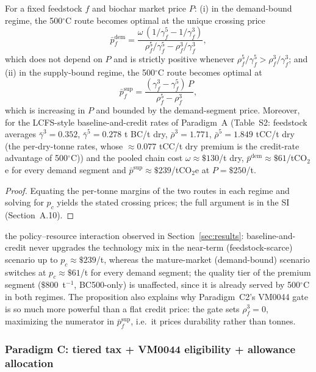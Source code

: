 \begin{proposition}
\label{prop:regime}
For a fixed feedstock $f$ and biochar market price $P$:
(i) in the demand-bound regime, the 500$^\circ$C route becomes optimal at
the unique crossing price
\begin{equation}
\bar{p}^{\mathrm{dem}}_f = \frac{\omega\,(1/\gamma^5_f-1/\gamma^3_f)}
{\rho^5_f/\gamma^5_f-\rho^3_f/\gamma^3_f},
\end{equation}
which does not depend on $P$ and is strictly positive whenever
$\rho^5_f/\gamma^5_f>\rho^3_f/\gamma^3_f$; and
(ii) in the supply-bound regime, the 500$^\circ$C route becomes optimal at
\begin{equation}
\bar{p}^{\mathrm{sup}}_f = \frac{(\gamma^3_f-\gamma^5_f)\,P}
{\rho^5_f-\rho^3_f},
\end{equation}
which is increasing in $P$ and bounded by the demand-segment price.
Moreover, for the LCFS-style baseline-and-credit rates of Paradigm~A
(Table~S2: feedstock averages $\bar{\gamma}^{3}=0.352$,
$\bar{\gamma}^{5}=0.278$ t BC/t dry, $\bar{\rho}^{3}=1.771$,
$\bar{\rho}^{5}=1.849$ tCC/t dry (the per-dry-tonne rates, whose
$\approx 0.077$ tCC/t dry premium is the credit-rate advantage of
500$^\circ$C)) and the pooled chain cost $\omega\approx\$130$/t dry,
$\bar{p}^{\mathrm{dem}}\approx\$61$/tCO$_2$e for every demand segment and
$\bar{p}^{\mathrm{sup}}\approx\$239$/tCO$_2$e at $P=\$250$/t.
\end{proposition}
\begin{proof}
Equating the per-tonne margins of the two routes in each regime and solving
for $p_c$ yields the stated crossing prices; the full argument is in the SI
(Section~A.10).
\end{proof} the policy--resource interaction observed in
Section~\ref{sec:results}: baseline-and-credit never
upgrades the technology mix in the near-term (feedstock-scarce) scenario up to
$p_c\approx\$239$/t, whereas the mature-market (demand-bound) scenario
switches at $p_c\approx\$61$/t for every demand segment; the quality
tier of the premium segment ($\$800$~t$^{-1}$, BC500-only) is unaffected,
since it is already served by 500$^\circ$C in both regimes. The proposition
also explains why Paradigm~C2's VM0044 gate is so much more powerful than a
flat credit price: the gate sets $\rho^3_f=0$, maximizing the numerator in
$\bar{p}^{\mathrm{sup}}_f$, i.e.\ it prices durability rather than tonnes.

\subsubsection{Paradigm C: tiered tax + VM0044 eligibility + allowance allocation}

